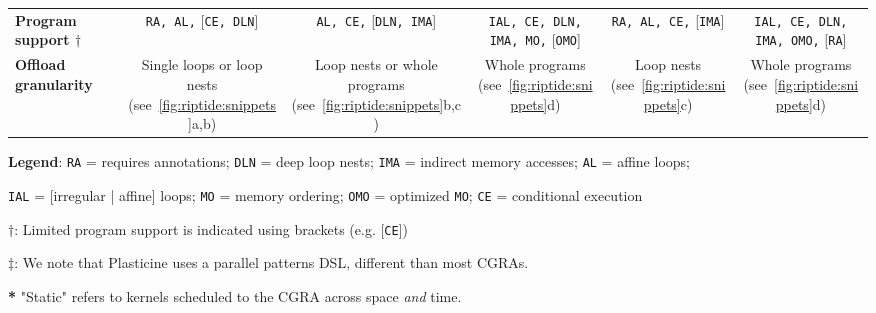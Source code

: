 {\begin{table}[htb]
\begin{threeparttable}
{\begin{tabular}{p{3cm}|cccc|c}
        \bf Program support $\dagger$ &
        \texttt{RA, AL,} [\texttt{CE, DLN}] & 
        \texttt{AL, CE,} [\texttt{DLN, IMA}] & 
        \thead{\texttt{IAL, CE, DLN,} \\ \texttt{IMA, MO,} [\texttt{OMO}]} &
        \texttt{RA, AL, CE,} [\texttt{IMA}] &
        \thead{\texttt{IAL, CE, DLN,} \\ \texttt{IMA, OMO,} [\texttt{RA}]}
			\\[.5ex]
				\bf Offload granularity &
        \thead{Single loops or loop \\ nests (see~\autoref{fig:riptide:snippets}a,b)} &
        \thead{Loop nests or  whole \\ programs (see~\autoref{fig:riptide:snippets}b,c)} &
        \thead{Whole programs \\ (see~\autoref{fig:riptide:snippets}d)} &
        \thead{Loop nests \\ (see~\autoref{fig:riptide:snippets}c)} &
        \thead{Whole programs \\ (see~\autoref{fig:riptide:snippets}d)}	
      \\[.5ex]
			\bottomrule
		 \end{tabular}
	}
  \begin{tablenotes}
    \tiny
  \item \textbf{Legend}: \texttt{RA} = requires annotations; \texttt{DLN} = deep loop nests; \texttt{IMA} = indirect memory accesses; \texttt{AL} = affine loops;
  \item \texttt{IAL} = [irregular | affine] loops; \texttt{MO} = memory ordering; \texttt{OMO} = optimized \texttt{MO}; \texttt{CE} = conditional execution
  \item \textbf{$\dagger$}: Limited program support is indicated using brackets (e.g. [\texttt{CE}])
  \item \textbf{$\ddagger$}: We note that Plasticine uses a parallel patterns DSL, different than most CGRAs. 
  \item \textbf{*} "Static" refers to kernels scheduled to the CGRA across space \textit{and} time.
  \end{tablenotes}
  \end{threeparttable}
	\end{table}
}

